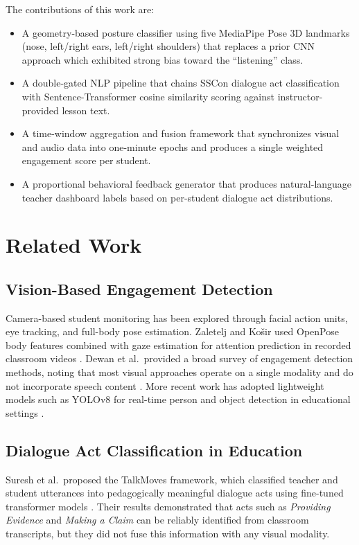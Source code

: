 \documentclass[conference]{IEEEtran}
\begin{document}
The contributions of this work are:
\begin{itemize}
    \item A geometry-based posture classifier using five MediaPipe Pose 3D landmarks (nose, left/right ears, left/right shoulders) that replaces a prior CNN approach which exhibited strong bias toward the ``listening'' class.
    \item A double-gated NLP pipeline that chains SSCon dialogue act classification with Sentence-Transformer cosine similarity scoring against instructor-provided lesson text.
    \item A time-window aggregation and fusion framework that synchronizes visual and audio data into one-minute epochs and produces a single weighted engagement score per student.
    \item A proportional behavioral feedback generator that produces natural-language teacher dashboard labels based on per-student dialogue act distributions.
\end{itemize}

\section{Related Work}

\subsection{Vision-Based Engagement Detection}
Camera-based student monitoring has been explored through facial action units, eye tracking, and full-body pose estimation. Zaletelj and Ko\v{s}ir used OpenPose body features combined with gaze estimation for attention prediction in recorded classroom videos \cite{zaletelj2017}.
Dewan et al.\ provided a broad survey of engagement detection methods, noting that most visual approaches operate on a single modality and do not incorporate speech content \cite{dewan2019}.
More recent work has adopted lightweight models such as YOLOv8 for real-time person and object detection in educational settings \cite{jocher2023}.

\subsection{Dialogue Act Classification in Education}
Suresh et al.\ proposed the TalkMoves framework, which classified teacher and student utterances into pedagogically meaningful dialogue acts using fine-tuned transformer models \cite{suresh2022}.
Their results demonstrated that acts such as \emph{Providing Evidence} and \emph{Making a Claim} can be reliably identified from classroom transcripts, but they did not fuse this information with any visual modality.
\end{document}
